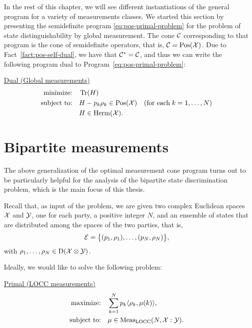 In the rest of this chapter, we will see different instantiations of the general
program for a variety of measurements classes. 
We started this section by presenting the semidefinite program 
\eqref{eq:pos-primal-problem} for the problem of  
state distinguishability by global measurement. The cone $\mathcal{C}$ corresponding to that program
is the cone of semidefinite operators, that is, $\mathcal{C} = \mathrm{Pos}(\mathcal{X})$. 
Due to Fact~\ref{fact:pos-self-dual}, we have that $\mathcal{C}^{\ast} = \mathcal{C}$, and  
thus we can write the following program dual to Program~\eqref{eq:pos-primal-problem}:
\begin{center}
\underline{Dual (Global measurements)}
\begin{equation}
  \label{eq:global-dual-problem}
  \begin{split}
    \text{minimize:} \quad & \operatorname{Tr}(H)\\
    \text{subject to:} \quad & H-p_k\rho_k \in \mathrm{Pos}(\mathcal{X})
    \quad(\text{for each}\;k = 1,\ldots,N)\\
    \quad & H \in \mathrm{Herm}(\mathcal{X}).
  \end{split}
\end{equation}
\end{center}

\section{Bipartite measurements}
The above generalization of the optimal measurement cone program turns out to be
particularly helpful for the analysis of the bipartite state discrimination problem,
which is the main focus of this thesis.

Recall that, as input of the problem, we are given two complex Euclidean 
spaces $\mathcal{X}$ and $\mathcal{Y}$, one for each party, a positive integer $N$, and an 
ensemble of states that are distributed among the spaces of the two parties, 
that is,
\begin{equation}
\label{eq:ensemble-bipartite}
    \mathcal{E} = \big\{ (p_{1}, \rho_{1}), \ldots, (p_{N}, \rho_{N}) \big\},
\end{equation}
with $\rho_{1}, \ldots, \rho_{N} \in \mathrm{D}(\mathcal{X}\otimes\mathcal{Y})$.

Ideally, we would like to solve the following problem:
\begin{center}
\underline{Primal (LOCC measurements)}
  \begin{equation}
    \label{eq:locc-primal-problem}
    \begin{split}
      \text{maximize:} \quad & 
        \sum_{k=1}^{N} p_{k}\ip{\rho_{k}}{\mu(k)},\\
      \text{subject to:} %
       \quad & \mu \in \Meas_{\LOCC}(N, \X:\Y).
    \end{split}
  \end{equation}
\end{center}

